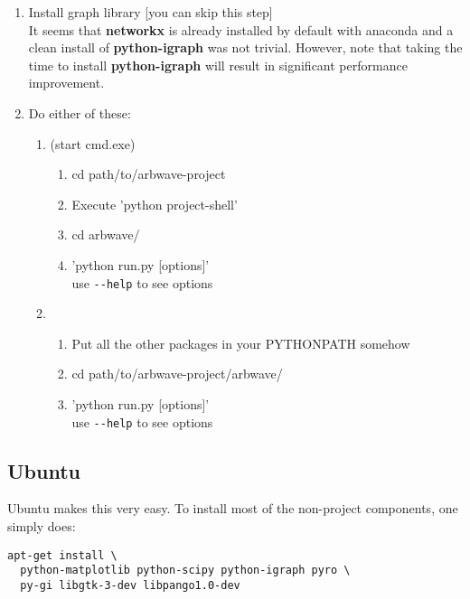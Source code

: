\begin{enumerate}
  \item Install graph library [you can skip this step] \\
    It seems that \textbf{networkx} is already installed by default with
    anaconda and a clean install of \textbf{python-igraph}
    was not trivial.  However, note that taking the time to install 
    \textbf{python-igraph} will result in significant performance improvement.

  \item Do either of these:
    \begin{enumerate}
      \item  (start cmd.exe)
        \begin{enumerate}
          \item cd path/to/arbwave-project
          \item Execute 'python project-shell'
          \item cd arbwave/
          \item 'python run.py [options]'\\
            use \verb|--help| to see options
        \end{enumerate}
      \item
        \begin{enumerate}
          \item Put all the other packages in your PYTHONPATH somehow
          \item cd path/to/arbwave-project/arbwave/
          \item 'python run.py [options]'\\
            use \verb|--help| to see options
        \end{enumerate}
    \end{enumerate}
\end{enumerate}



\subsection{Ubuntu}
Ubuntu makes this very easy.  To install most of the non-project components, one
simply does:

\begin{verbatim}
apt-get install \
  python-matplotlib python-scipy python-igraph pyro \
  py-gi libgtk-3-dev libpango1.0-dev
\end{verbatim}


